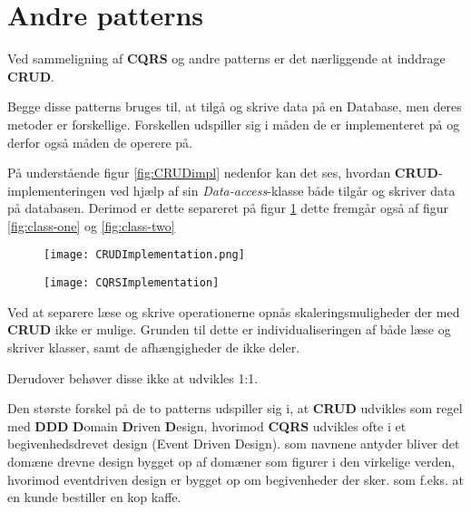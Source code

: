 \section{Andre patterns}
Ved sammeligning af \textbf{CQRS} og andre patterns er det nærliggende at inddrage \textbf{CRUD}.

Begge disse patterns bruges til, at tilgå og skrive data på en Database, men deres metoder er forskellige. Forskellen udspiller sig i måden de er implementeret på og derfor også måden de operere på.\newline

På understående figur \ref{fig:CRUDimpl} nedenfor kan det ses, hvordan \textbf{CRUD}-implementeringen ved hjælp af sin \textit{Data-access}-klasse både tilgår og skriver data på databasen. Derimod er dette separeret på figur \ref{fig:CQRSimpl} dette fremgår også af figur \ref{fig:class-one} og \ref{fig:class-two}

\begin{figure}[H]
	\centering
	\begin{minipage}{.5\textwidth}
		\centering
		\texttt{[image: CRUDImplementation.png]}
		\label{fig:CRUDimpl}
	\end{minipage}%
	\begin{minipage}{.5\textwidth}
		\centering
		\texttt{[image: CQRSImplementation]}
		\label{fig:CQRSimpl}
	\end{minipage}
\end{figure}


Ved at separere læse og skrive operationerne opnås skaleringsmuligheder der med \textbf{CRUD} ikke er mulige. Grunden til dette er individualiseringen af både læse og skriver klasser, samt de afhængigheder de ikke deler.\newline

Derudover behøver disse ikke at udvikles 1:1.\newline

Den største forskel på de to patterns udspiller sig i, at \textbf{CRUD} udvikles som regel med \textbf{DDD} \textbf{D}omain \textbf{D}riven \textbf{D}esign, hvorimod \textbf{CQRS} udvikles ofte i et begivenhedsdrevet design (Event Driven Design). som navnene antyder bliver det domæne drevne design bygget op af domæner som figurer i den virkelige verden, hvorimod eventdriven design er bygget op om begivenheder der sker. som f.eks. at en kunde bestiller en kop kaffe.

